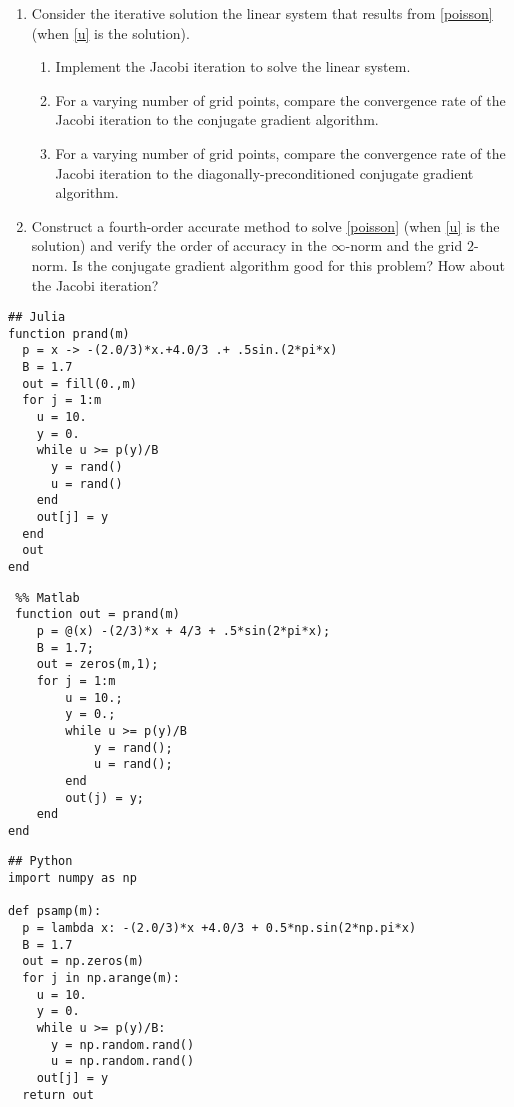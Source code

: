 \documentclass[10pt]{amsart}
\begin{document}
\begin{enumerate}[label={\bf Problem~{\arabic*}:}]
  \mline 
  \item Consider the iterative solution the linear system that results
    from \eqref{poisson} (when \eqref{u} is the solution).
    \begin{enumerate}
    \item Implement the Jacobi iteration to solve the linear system.
    \item For a varying number of grid points, compare the convergence rate of the Jacobi iteration to the
      conjugate gradient algorithm.
      \item For a varying number of grid points, compare the convergence rate of the Jacobi iteration to
        the diagonally-preconditioned conjugate gradient algorithm.
    \end{enumerate}

    \mline
    \item Construct a fourth-order accurate method to solve \eqref{poisson}
      (when \eqref{u} is the solution) and verify the order of
      accuracy in the $\infty$-norm and the grid $2$-norm.  Is the conjugate gradient algorithm good for this
      problem?  How about the Jacobi iteration?
    
    \end{enumerate}

     \mline
\begin{lstlisting}
## Julia
function prand(m)
  p = x -> -(2.0/3)*x.+4.0/3 .+ .5sin.(2*pi*x)
  B = 1.7
  out = fill(0.,m)
  for j = 1:m
    u = 10.
    y = 0.
    while u >= p(y)/B
      y = rand()
      u = rand()
    end
    out[j] = y
  end
  out     
end
  \end{lstlisting}
    \begin{lstlisting}
 %% Matlab
 function out = prand(m) 
    p = @(x) -(2/3)*x + 4/3 + .5*sin(2*pi*x);
    B = 1.7;
    out = zeros(m,1);
    for j = 1:m
        u = 10.;
        y = 0.;
        while u >= p(y)/B
            y = rand();
            u = rand();
        end
        out(j) = y;
    end     
end
  \end{lstlisting}
  \begin{lstlisting}
## Python
import numpy as np
    
def psamp(m):
  p = lambda x: -(2.0/3)*x +4.0/3 + 0.5*np.sin(2*np.pi*x)
  B = 1.7
  out = np.zeros(m)
  for j in np.arange(m):
    u = 10.
    y = 0.
    while u >= p(y)/B:
      y = np.random.rand()
      u = np.random.rand()
    out[j] = y
  return out
\end{lstlisting}
\end{document}
